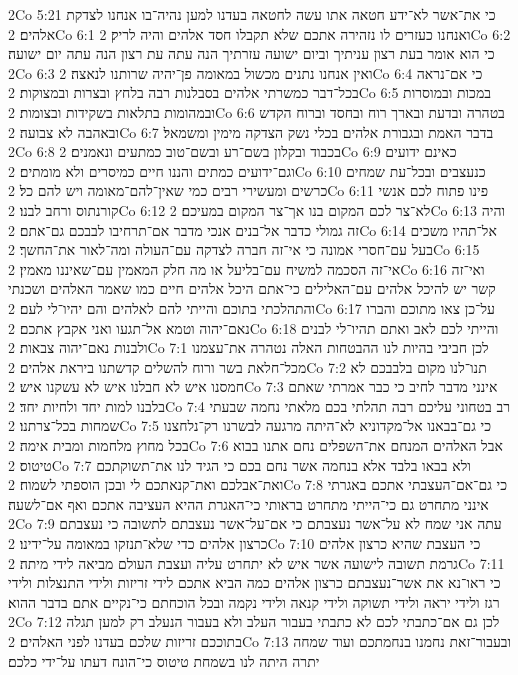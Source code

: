 2Co 5:21  כי את־אשר לא־ידע חטאה אתו עשה לחטאה בעדנו למען נהיה־בו אנחנו לצדקת אלהים׃
2Co 6:1  ואנחנו כעזרים לו נזהירה אתכם שלא תקבלו חסד אלהים והיה לריק׃
2Co 6:2  כי הוא אומר בעת רצון עניתיך וביום ישועה עזרתיך הנה עתה עת רצון הנה עתה יום ישועה׃
2Co 6:3  ואין אנחנו נתנים מכשול במאומה פן־יהיה שרותנו לנאצה׃
2Co 6:4  כי אם־נראה בכל־דבר כמשרתי אלהים בסבלנות רבה בלחץ ובצרות ובמצוקות׃
2Co 6:5  במכות ובמוסרות ובמהומות בתלאות בשקידות ובצומות׃
2Co 6:6  בטהרה ובדעת ובארך רוח ובחסד וברוח הקדש ובאהבה לא צבועה׃
2Co 6:7  בדבר האמת ובגבורת אלהים בכלי נשק הצדקה מימין ומשמאל׃
2Co 6:8  בכבוד ובקלון בשם־רע ובשם־טוב כמתעים ונאמנים׃
2Co 6:9  כאינם ידועים וגם־ידועים כמתים והננו חיים כמיסרים ולא מומתים׃
2Co 6:10  כנעצבים ובכל־עת שמחים כרשים ומעשירי רבים כמי שאין־להם־מאומה ויש להם כל׃
2Co 6:11  פינו פתוח לכם אנשי קורנתוס ורחב לבנו׃
2Co 6:12  לא־צר לכם המקום בנו אך־צר המקום במעיכם׃
2Co 6:13  והיה זה גמולי כדבר אל־בנים אנכי מדבר אם־תרחיבו לבבכם גם־אתם׃
2Co 6:14  אל־תהיו משכים בעל עם־חסרי אמונה כי אי־זה חברה לצדקה עם־העולה ומה־לאור את־החשך׃
2Co 6:15  אי־זה הסכמה למשיח עם־בליעל או מה חלק המאמין עם־שאיננו מאמין׃
2Co 6:16  ואי־זה קשר יש להיכל אלהים עם־האלילים כי־אתם היכל אלהים חיים כמו שאמר האלהים ושכנתי והתהלכתי בתוכם והייתי להם לאלהים והם יהיו־לי לעם׃
2Co 6:17  על־כן צאו מתוכם והברו נאם־יהוה וטמא אל־תגעו ואני אקבץ אתכם׃
2Co 6:18  והייתי לכם לאב ואתם תהיו־לי לבנים ולבנות נאם־יהוה צבאות׃
2Co 7:1  לכן חביבי בהיות לנו ההבטחות האלה נטהרה את־עצמנו מכל־חלאת בשר ורוח להשלים קדשתנו ביראת אלהים׃
2Co 7:2  תנו־לנו מקום בלבבכם לא חמסנו איש לא חבלנו איש לא עשקנו איש׃
2Co 7:3  אינני מדבר לחיב כי כבר אמרתי שאתם בלבנו למות יחד ולחיות יחד׃
2Co 7:4  רב בטחוני עליכם רבה תהלתי בכם מלאתי נחמה שבעתי שמחות בכל־צרתנו׃
2Co 7:5  כי גם־בבאנו אל־מקדוניא לא־היתה מרגעה לבשרנו רק־נלחצנו בכל מחוץ מלחמות ומבית אימה׃
2Co 7:6  אבל האלהים המנחם את־השפלים נחם אתנו בבוא טיטוס׃
2Co 7:7  ולא בבאו בלבד אלא בנחמה אשר נחם בכם כי הגיד לנו את־תשוקתכם ואת־אבלכם ואת־קנאתכם לי ובכן הוספתי לשמוח׃
2Co 7:8  כי גם־אם־העצבתי אתכם באגרתי אינני מתחרט גם כי־הייתי מתחרט בראותי כי־האגרת ההיא העציבה אתכם ואף אם־לשעה׃
2Co 7:9  עתה אני שמח לא על־אשר נעצבתם כי אם־על־אשר נעצבתם לתשובה כי נעצבתם כרצון אלהים כדי שלא־תנזקו במאומה על־ידינו׃
2Co 7:10  כי העצבת שהיא כרצון אלהים גרמת תשובה לישועה אשר איש לא יתחרט עליה ועצבת העולם מביאה לידי מיתה׃
2Co 7:11  כי ראו־נא את אשר־נעצבתם כרצון אלהים כמה הביא אתכם לידי זריזות ולידי התנצלות ולידי רגז ולידי יראה ולידי תשוקה ולידי קנאה ולידי נקמה ובכל הוכחתם כי־נקיים אתם בדבר ההוא׃
2Co 7:12  לכן גם אם־כתבתי לכם לא כתבתי בעבור העלב ולא בעבור הנעלב רק למען תגלה בתוככם זריזות שלכם בעדנו לפני האלהים׃
2Co 7:13  ובעבור־זאת נחמנו בנחמתכם ועוד שמחה יתרה היתה לנו בשמחת טיטוס כי־הונח דעתו על־ידי כלכם׃
